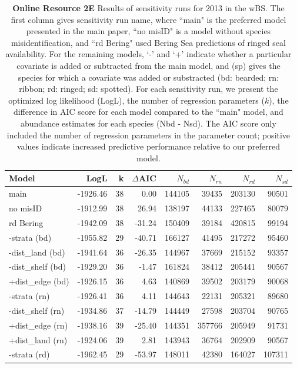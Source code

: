 \documentclass{svjour3}
\begin{document}
\begin{table}[htbp]
\centering
\caption{\textbf{Online Resource 2E} Results of sensitivity runs for 2013 in the wBS. The first column gives sensitivity run name, where ``main" is the preferred model presented in the main paper, ``no misID" is a model without species misidentification, and ``rd Bering" used Bering Sea predictions of ringed seal availability.  For the remaining models, `-' and `+' indicate whether a particular covariate is added or subtracted from the main model, and (sp) gives the species for which a covariate was added or substracted (bd: bearded; rn: ribbon; rd: ringed; sd: spotted).  For each sensitivity run, we present the optimized log likelihood (LogL), the number of regression parameters ($k$), the difference in AIC score for each model compared to the ``main" model, and abundance estimates for each species (Nbd - Nsd).  The AIC score only included the number of regression parameters in the parameter count; positive values indicate increased predictive performance relative to our preferred model.}
\begin{tabular}{lrrrrrrr}
  \hline
Model & LogL & k & $\Delta$AIC & $N_{bd}$ & $N_{rn}$ & $N_{rd}$ & $N_{sd}$ \\
  \hline
main & -1926.46 & 38 & 0.00 & 144105 & 39435 & 203130 & 90501 \\
  no misID & -1912.99 & 38 & 26.94 & 138197 & 44133 & 227465 & 80079 \\
  rd Bering & -1942.09 & 38 & -31.24 & 150409 & 39184 & 420815 & 99194 \\
  -strata (bd) & -1955.82 & 29 & -40.71 & 166127 & 41495 & 217272 & 95460 \\
  -dist\_land (bd) & -1941.64 & 36 & -26.35 & 144967 & 37669 & 215152 & 93357 \\
  -dist\_shelf (bd) & -1929.20 & 36 & -1.47 & 161824 & 38412 & 205441 & 90567 \\
  +dist\_edge (bd) & -1926.15 & 36 & 4.63 & 140869 & 39502 & 203179 & 90068 \\
  -strata (rn) & -1926.41 & 36 & 4.11 & 144643 & 22131 & 205321 & 89680 \\
  -dist\_shelf (rn) & -1934.86 & 37 & -14.79 & 144449 & 27598 & 203704 & 90765 \\
  +dist\_edge (rn) & -1938.16 & 39 & -25.40 & 144351 & 357766 & 205949 & 91731 \\
  +dist\_land (rn) & -1924.06 & 39 & 2.81 & 143943 & 36764 & 202909 & 90567 \\
  -strata (rd) & -1962.45 & 29 & -53.97 & 148011 & 42380 & 164027 & 107311 \\

\end{tabular}
\end{table}
\end{document}
